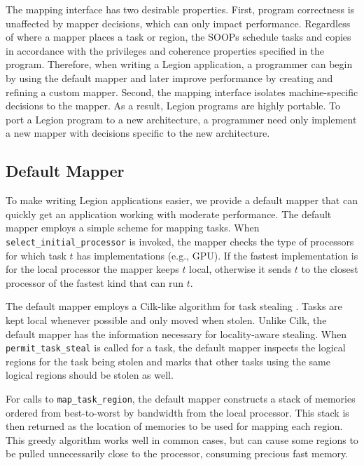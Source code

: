 The mapping interface has two desirable properties.  
First, program correctness is unaffected by mapper decisions, which can only impact 
performance.  Regardless of where a mapper places a task or region,
the SOOPs schedule tasks and copies in accordance with the privileges
and coherence properties specified in the program.  Therefore, when
writing a Legion application, a programmer can begin by using the
default mapper and later improve performance by creating and refining a custom mapper.
Second, the mapping interface isolates machine-specific decisions
to the mapper.  As a result, Legion programs are highly
portable.  To port a Legion program to a new architecture, a programmer need only
implement a new mapper with decisions specific to the new architecture. 

\subsection{Default Mapper}
\label{sec:defmapper}
To make writing Legion applications easier, we provide a default
mapper that can quickly get an application working
with moderate performance.  The default mapper employs a
simple scheme for mapping tasks.  When {\tt
select\_initial\_processor} is invoked, the mapper
checks the type of processors for which task $t$ has
implementations (e.g., GPU).  If the fastest implementation is for the
local processor the mapper keeps $t$ local, otherwise
it sends $t$ to the closest processor of the fastest kind that can run
$t$.


The default mapper employs a Cilk-like algorithm for task
stealing \cite{CILK95}.  Tasks are kept local 
whenever possible and only moved when stolen.  Unlike Cilk, the
default mapper has the information necessary for locality-aware
stealing.  When {\tt permit\_task\_steal} is called for a task, the
default mapper inspects the logical regions for the task being stolen
and marks that other tasks using the same logical regions should
be stolen as well.

For calls to {\tt map\_task\_region}, the default mapper constructs a stack of memories ordered from best-to-worst
by bandwidth from the local processor.  This stack is then returned as the location of memories to be used for
mapping each region.  This greedy algorithm works well in common cases, but can cause some 
regions to be pulled unnecessarily close to the processor, consuming precious fast memory.

